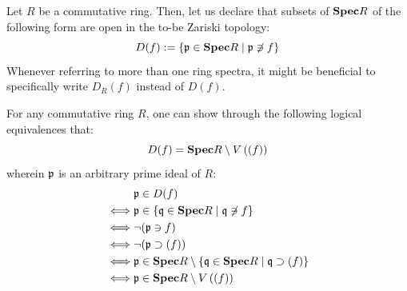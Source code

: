                 \begin{definition} \label{def: zariski_open}
                    Let $R$ be a commutative ring. Then, let us declare that subsets of $\mathbf{Spec} R$ of the following form are open in the to-be Zariski topology:
                        $$D(f) := \{\mathfrak{p} \in \mathbf{Spec} R \mid \mathfrak{p} \not \ni f\}$$
                    Whenever referring to more than one ring spectra, it might be beneficial to specifically write $D_R(f)$ instead of $D(f)$.
                \end{definition}
                \begin{remark} \label{remark: basic_opens_complements}
                    For any commutative ring $R$, one can show through the following logical equivalences that:
                        $$D(f) = \mathbf{Spec} R \setminus V\left((f)\right)$$
                    wherein $\mathfrak{p}$ is an arbitrary prime ideal of $R$:
                        $$
                            \begin{aligned}
                                & \mathfrak{p} \in D(f)
                                \\
                                \iff & \mathfrak{p} \in \{\mathfrak{q} \in \mathbf{Spec} R \mid \mathfrak{q} \not \ni f\}
                                \\
                                \iff & \neg(\mathfrak{p} \ni f)
                                \\
                                \iff & \neg(\mathfrak{p} \supset (f))
                                \\
                                \iff & \mathfrak{p} \in \mathbf{Spec} R \setminus \{\mathfrak{q} \in \mathbf{Spec} R \mid \mathfrak{q} \supset (f)\}
                                \\
                                \iff & \mathfrak{p} \in \mathbf{Spec} R \setminus V\left((f)\right)
                            \end{aligned}
                        $$
                \end{remark}
                
